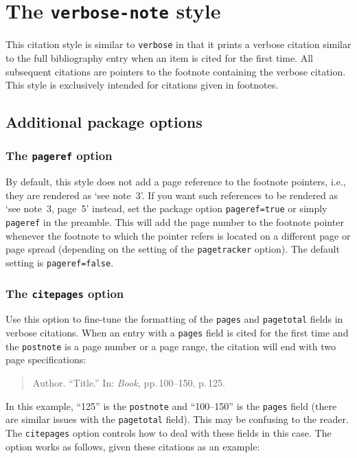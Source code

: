 \documentclass[a4paper]{article}
\begin{document}
\section*{The \texttt{verbose-note} style}

This citation style is similar to \texttt{verbose} in that it prints
a verbose citation similar to the full bibliography entry when an
item is cited for the first time. All subsequent citations are
pointers to the footnote containing the verbose citation. This style
is exclusively intended for citations given in footnotes.

\subsection*{Additional package options}

\subsubsection*{The \texttt{pageref} option}

By default, this style does not add a page reference to the footnote
pointers, i.e., they are rendered as `see note~3'. If you want such
references to be rendered as `see note~3, page~5' instead, set the
package option \texttt{pageref=true} or simply \texttt{pageref} in
the preamble. This will add the page number to the footnote pointer
whenever the footnote to which the pointer refers is located on a
different page or page spread (depending on the setting of the
\texttt{pagetracker} option). The default setting is
\texttt{pageref=false}.

\subsubsection*{The \texttt{citepages} option}

Use this option to fine-tune the formatting of the \texttt{pages}
and \texttt{pagetotal} fields in verbose citations. When an entry
with a \texttt{pages} field is cited for the first time and the
\texttt{postnote} is a page number or a page range, the citation
will end with two page specifications:

\begin{quote}
Author. \enquote{Title.} In: \emph{Book,} pp.\,100--150, p.\,125.
\end{quote}
%
In this example, \enquote{125} is the \texttt{postnote} and
\enquote{100--150} is the \texttt{pages} field (there are similar
issues with the \texttt{pagetotal} field). This may be confusing to
the reader. The \texttt{citepages} option controls how to deal with
these fields in this case. The option works as follows, given these
citations as an example:
\end{document}
